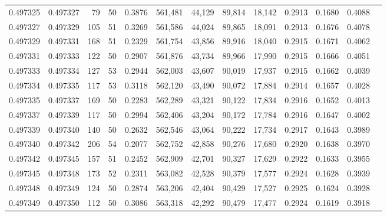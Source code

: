 \begin{tabular}{rrrrrrrrrrrrr}
0.497325 & 0.497327 &    79 &  50 &                                     0.3876 & 561,481 &  44,129 &  89,814 &  18,142 & 0.2913 & 0.1680 & 0.4088 \\
0.497327 & 0.497329 &   105 &  51 &                                     0.3269 & 561,586 &  44,024 &  89,865 &  18,091 & 0.2913 & 0.1676 & 0.4078 \\
0.497329 & 0.497331 &   168 &  51 &                                     0.2329 & 561,754 &  43,856 &  89,916 &  18,040 & 0.2915 & 0.1671 & 0.4062 \\
0.497331 & 0.497333 &   122 &  50 &                                     0.2907 & 561,876 &  43,734 &  89,966 &  17,990 & 0.2915 & 0.1666 & 0.4051 \\
0.497333 & 0.497334 &   127 &  53 &                                     0.2944 & 562,003 &  43,607 &  90,019 &  17,937 & 0.2915 & 0.1662 & 0.4039 \\
0.497334 & 0.497335 &   117 &  53 &                                     0.3118 & 562,120 &  43,490 &  90,072 &  17,884 & 0.2914 & 0.1657 & 0.4028 \\
0.497335 & 0.497337 &   169 &  50 &                                     0.2283 & 562,289 &  43,321 &  90,122 &  17,834 & 0.2916 & 0.1652 & 0.4013 \\
0.497337 & 0.497339 &   117 &  50 &                                     0.2994 & 562,406 &  43,204 &  90,172 &  17,784 & 0.2916 & 0.1647 & 0.4002 \\
0.497339 & 0.497340 &   140 &  50 &                                     0.2632 & 562,546 &  43,064 &  90,222 &  17,734 & 0.2917 & 0.1643 & 0.3989 \\
0.497340 & 0.497342 &   206 &  54 &                                     0.2077 & 562,752 &  42,858 &  90,276 &  17,680 & 0.2920 & 0.1638 & 0.3970 \\
0.497342 & 0.497345 &   157 &  51 &                                     0.2452 & 562,909 &  42,701 &  90,327 &  17,629 & 0.2922 & 0.1633 & 0.3955 \\
0.497345 & 0.497348 &   173 &  52 &                                     0.2311 & 563,082 &  42,528 &  90,379 &  17,577 & 0.2924 & 0.1628 & 0.3939 \\
0.497348 & 0.497349 &   124 &  50 &                                     0.2874 & 563,206 &  42,404 &  90,429 &  17,527 & 0.2925 & 0.1624 & 0.3928 \\
0.497349 & 0.497350 &   112 &  50 &                                     0.3086 & 563,318 &  42,292 &  90,479 &  17,477 & 0.2924 & 0.1619 & 0.3918 \\

\end{tabular}
